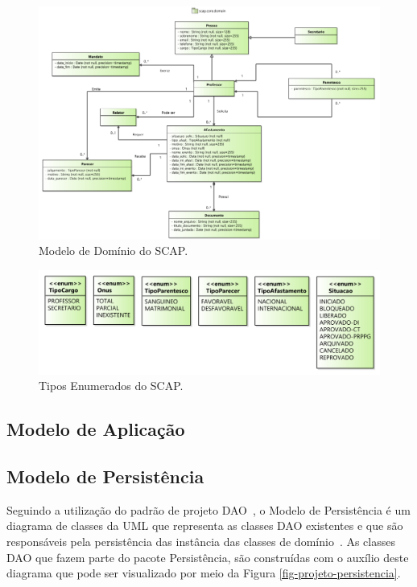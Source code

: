 \begin{figure}[h]
	\centering
	\includegraphics[scale=0.45]{figuras/fig-projeto-dominio} 
	\caption{Modelo de Domínio do SCAP.}
	\label{fig-projeto-dominio}
\end{figure}

\begin{figure}[h]
	\centering
	\includegraphics[scale=0.4]{figuras/fig-projeto-enum} 
	\caption{Tipos Enumerados do SCAP.}
	\label{fig-projeto-enum}
\end{figure}

\subsection{Modelo de Aplicação}
\label{sec-projeto-modelo-aplicacao}

\subsection{Modelo de Persistência}
\label{sec-projeto-modelo-persistencia}

Seguindo a utilização do padrão de projeto DAO~\cite{alur-et-al:bpds03}, o Modelo de Persistência é um diagrama de classes da UML que representa as classes DAO existentes e que são responsáveis pela persistência das instância das classes de domínio~\cite{souza:masterthesis07}. As classes DAO que fazem parte do pacote Persistência, são construídas com o auxílio deste diagrama que pode ser visualizado por meio da Figura \ref{fig-projeto-persistencia}.

